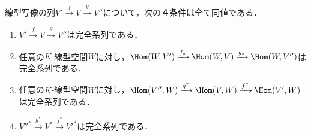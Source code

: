 \documentclass[uplatex, dvipdfmx]{jsreport}
\begin{document}
\begin{proposition}[完全系列の普遍性]\label{proposition-universality-of-exact-sequence}
    線型写像の列$V'\xrightarrow{f}V\xrightarrow{g}V''$について，次の４条件は全て同値である．
    \begin{enumerate}
        \item $V'\xrightarrow{f}V\xrightarrow{g}V''$は完全系列である．
        \item 任意の$K$-線型空間$W$に対し，$\Hom(W,V')\xrightarrow{f_*}\Hom(W,V)\xrightarrow{g_*}\Hom(W,V'')$は完全系列である．
        \item 任意の$K$-線型空間$W$に対し，$\Hom(V'',W)\xrightarrow{g^*}\Hom(V,W)\xrightarrow{f^*}\Hom(V',W)$は完全系列である．
        \item $V''^*\xrightarrow{g^*}V^*\xrightarrow{f^*}V'^*$は完全系列である．
    \end{enumerate}
\end{proposition}
\end{document}
